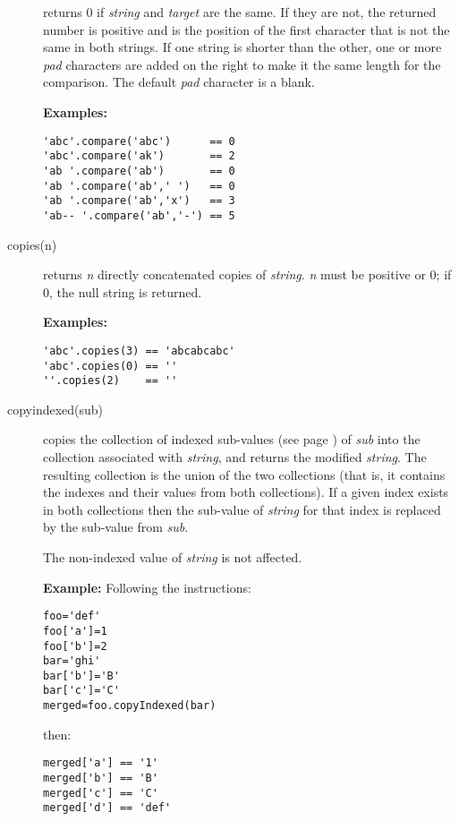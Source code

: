 \begin{description}
returns 0 if \emph{string} and \emph{target}
are the same.
If they are not, the returned number is positive and is the position of
the first character that is not the same in both strings.
If one string is shorter than the other, one or more \emph{pad}
characters are added on the right to make it the same length for the
comparison.
The default \emph{pad} character is a blank.
 
\textbf{Examples:}
\begin{lstlisting}
'abc'.compare('abc')      == 0
'abc'.compare('ak')       == 2
'ab '.compare('ab')       == 0
'ab '.compare('ab',' ')   == 0
'ab '.compare('ab','x')   == 3
'ab-- '.compare('ab','-') == 5
\end{lstlisting}
\item[copies(n)]\label{refcopies}
returns \emph{n} directly concatenated copies of
\emph{string}.
\emph{n} must be positive or 0; if 0, the null string is returned.
 
\textbf{Examples:}
\begin{lstlisting}
'abc'.copies(3) == 'abcabcabc'
'abc'.copies(0) == ''
''.copies(2)    == ''
\end{lstlisting}
\item[copyindexed(sub)]\label{refcopyind}
copies the collection of indexed  sub-values (see page \pageref{refinstr}) 
of \emph{sub} into the collection associated with
\emph{string}, and returns the modified \emph{string}.  The
resulting collection is the union of the two collections (that is,
it contains the indexes and their values from both collections).
If a given index exists in both collections then the sub-value of
\emph{string} for that index is replaced by the sub-value from
\emph{sub}.
 
The non-indexed value of \emph{string} is not affected.
 
\textbf{Example:}
 Following the instructions:
\begin{lstlisting}
foo='def'
foo['a']=1
foo['b']=2
bar='ghi'
bar['b']='B'
bar['c']='C'
merged=foo.copyIndexed(bar)
\end{lstlisting}
then:
\begin{lstlisting}
merged['a'] == '1'
merged['b'] == 'B'
merged['c'] == 'C'
merged['d'] == 'def'
\end{lstlisting}



\end{description}
